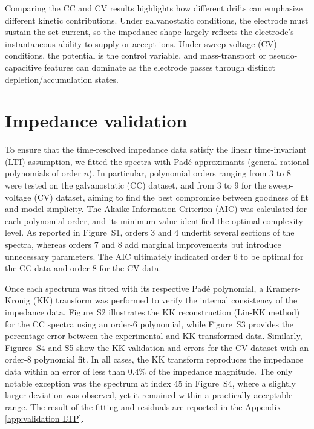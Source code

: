 Comparing the CC and CV results highlights how different drifts can emphasize different kinetic contributions. Under galvanostatic conditions, the electrode must sustain the set current, so the impedance shape largely reflects the electrode's instantaneous ability to supply or accept ions. Under sweep-voltage (CV) conditions, the potential is the control variable, and mass-transport or pseudo-capacitive features can dominate as the electrode passes through distinct depletion/accumulation states.




\section{Impedance validation}
To ensure that the time-resolved impedance data satisfy the linear time-invariant (LTI) assumption, we fitted the spectra with Padé approximants (general rational polynomials of order $n$). In particular, polynomial orders ranging from 3 to 8 were tested on the galvanostatic (CC) dataset, and from 3 to 9 for the sweep-voltage (CV) dataset, aiming to find the best compromise between goodness of fit and model simplicity. The Akaike Information Criterion (AIC) was calculated for each polynomial order, and its minimum value identified the optimal complexity level. As reported in Figure~S1, orders 3 and 4 underfit several sections of the spectra, whereas orders 7 and 8 add marginal improvements but introduce unnecessary parameters. The AIC ultimately indicated order 6 to be optimal for the CC data and order 8 for the CV data.

Once each spectrum was fitted with its respective Padé polynomial, a Kramers-Kronig (KK) transform was performed to verify the internal consistency of the impedance data. Figure~S2 illustrates the KK reconstruction (Lin-KK method) for the CC spectra using an order-6 polynomial, while Figure~S3 provides the percentage error between the experimental and KK-transformed data. Similarly, Figures~S4 and S5 show the KK validation and errors for the CV dataset with an order-8 polynomial fit. In all cases, the KK transform reproduces the impedance data within an error of less than 0.4\% of the impedance magnitude. The only notable exception was the spectrum at index 45 in Figure~S4, where a slightly larger deviation was observed, yet it remained within a practically acceptable range. The result of the fitting and residuals are reported in the Appendix \ref{app:validation LTP}.

